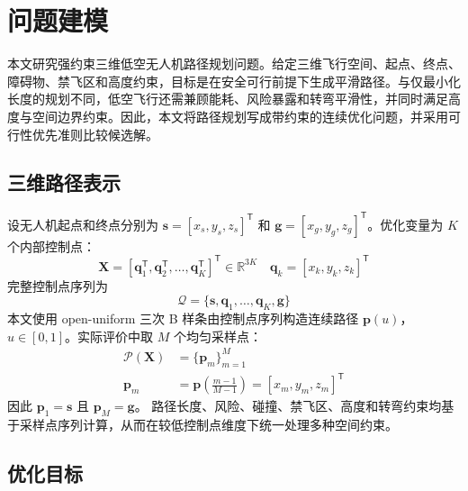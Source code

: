 \section{问题建模}

\label{sec:problem-formulation}

本文研究强约束三维低空无人机路径规划问题。给定三维飞行空间、起点、终点、障碍物、禁飞区和高度约束，目标是在安全可行前提下生成平滑路径。与仅最小化长度的规划不同，低空飞行还需兼顾能耗、风险暴露和转弯平滑性，并同时满足高度与空间边界约束。因此，本文将路径规划写成带约束的连续优化问题，并采用可行性优先准则比较候选解。

\subsection{三维路径表示}

设无人机起点和终点分别为 $\mathbf{s}=[x_s,y_s,z_s]^\mathsf{T}$ 和 $\mathbf{g}=[x_g,y_g,z_g]^\mathsf{T}$。优化变量为 $K$ 个内部控制点：
\begin{equation}
    \mathbf{X}=
    [\mathbf{q}_1^\mathsf{T},\mathbf{q}_2^\mathsf{T},\ldots,\mathbf{q}_K^\mathsf{T}]^\mathsf{T}\in\mathbb{R}^{3K}
    \quad
    \mathbf{q}_k=[x_k,y_k,z_k]^\mathsf{T}
    \label{eq:path-control-vector}
\end{equation}
完整控制点序列为
\begin{equation}
    \mathcal{Q}=\{\mathbf{s},\mathbf{q}_1,\ldots,\mathbf{q}_K,\mathbf{g}\}
    \label{eq:control-sequence}
\end{equation}
本文使用 open-uniform 三次 B 样条由控制点序列构造连续路径 $\mathbf{p}(u)$，$u\in[0,1]$。实际评价中取 $M$ 个均匀采样点：
\begin{equation}
    \begin{aligned}
    \mathcal{P}(\mathbf{X})&=\{\mathbf{p}_m\}_{m=1}^{M}\\
    \mathbf{p}_m&=\mathbf{p}\!\left(\frac{m-1}{M-1}\right)=[x_m,y_m,z_m]^\mathsf{T}
    \end{aligned}
    \label{eq:path-sampling}
\end{equation}
因此 $\mathbf p_1=\mathbf s$ 且 $\mathbf p_M=\mathbf g$。
路径长度、风险、碰撞、禁飞区、高度和转弯约束均基于采样点序列计算，从而在较低控制点维度下统一处理多种空间约束。

\subsection{优化目标}


